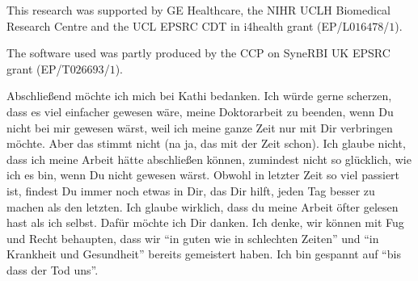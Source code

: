 \begin{acknowledgements}
    This research was supported by \gls{GE} Healthcare, the \gls{NIHR} \gls{UCLH} Biomedical Research Centre and the \gls{UCL} \gls{EPSRC} \gls{CDT} in \gls{i4health} grant (EP/L$016478$/$1$).
    
    The software used was partly produced by the \gls{CCP} on \gls{SyneRBI} \gls{UK} \gls{EPSRC} grant (EP/T$026693$/$1$).

    Abschließend möchte ich mich bei Kathi bedanken. Ich würde gerne scherzen, dass es viel einfacher gewesen wäre, meine Doktorarbeit zu beenden, wenn Du nicht bei mir gewesen wärst, weil ich meine ganze Zeit nur mit Dir verbringen möchte. Aber das stimmt nicht (na ja, das mit der Zeit schon). Ich glaube nicht, dass ich meine Arbeit hätte abschließen können, zumindest nicht so glücklich, wie ich es bin, wenn Du nicht gewesen wärst. Obwohl in letzter Zeit so viel passiert ist, findest Du immer noch etwas in Dir, das Dir hilft, jeden Tag besser zu machen als den letzten. Ich glaube wirklich, dass du meine Arbeit öfter gelesen hast als ich selbst. Dafür möchte ich Dir danken. Ich denke, wir können mit Fug und Recht behaupten, dass wir ``in guten wie in schlechten Zeiten'' und ``in Krankheit und Gesundheit'' bereits gemeistert haben. Ich bin gespannt auf ``bis dass der Tod uns''.

    

\end{acknowledgements}
